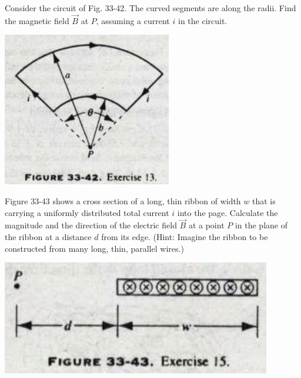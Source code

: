\documentclass[11pt,letterpaper,boxed]{hmcpset}
\begin{document}
	\begin{problem} [HRK E33.13] Consider the circuit of Fig. 33-42. The curved segments are along the radii. Find the magnetic field $\vec{B}$ at $P$, assuming a current $i$ in the circuit.
	\begin{center}
		\includegraphics[scale=.6]{51m8pic2.jpg}
		\end{center}
	\end{problem}
	\begin{solution}
		\vfill
	\end{solution}
	\newpage

	\begin{problem} [HRK E33.15] Figure 33-43 shows a cross section of a long, thin ribbon of width $w$ that is carrying a uniformly distributed total current $i$ into the page. Calculate the magnitude and the direction of the electric field $\vec{B}$ at a point $P$ in the plane of the ribbon at a distance $d$ from its edge. (Hint: Imagine the ribbon to be constructed from many long, thin, parallel wires.)
			\begin{center}
		\includegraphics[scale=.5]{51m8pic3.jpg}
		\end{center}
	\end{problem}
	
	\begin{solution}
		\vfill
	\end{solution}
	\newpage	
	
\end{document}
